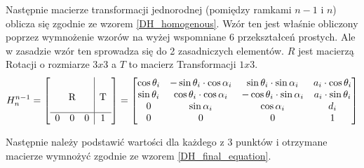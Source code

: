 Następnie macierze transformacji jednorodnej (pomiędzy ramkami $n-1$ i $n$) oblicza się zgodnie ze wzorem \ref{DH_homogenous}. Wzór ten jest właśnie obliczony poprzez wymnożenie wzorów na wyżej wspomniane 6 przekształceń prostych. Ale w zasadzie wzór ten sprowadza się do 2 zasadniczych elementów. $R$ jest macierzą Rotacji o rozmiarze $3x3$ a $T$ to macierz Transformacji $1x3$. \\

\begin{equation} \label{DH_homogenous}
H^{n-1}_n = 
\left[\begin{array}{ccc|c}
&&&\\
&&&\\
\multicolumn{3}{c|}{\smash{\raisebox{0.75\normalbaselineskip}{R}}} & \smash{\raisebox{0.75\normalbaselineskip}{T}}\\
\hline
0 & 0 & 0 & 1\\
\end{array}\right] = 
\left[\begin{matrix}
\cos{\theta_i} & -\sin{\theta_i} \cdot \cos{\alpha_i} & \sin{\theta_i} \cdot \sin{\alpha_i} & a_i \cdot \cos{\theta_i}\\
\sin{\theta_i} & \cos{\theta_i} \cdot \cos{\alpha_i} & -\cos{\theta_i} \cdot \sin{\alpha_i} & a_i \cdot \sin{\theta_i}\\
0 & \sin{\alpha_i} & \cos{\alpha_i} & d_i\\
0 & 0 & 0 & 1\\
\end{matrix}\right]
\end{equation}\cite{DH_matrix_AA_article}


Następnie należy podstawić wartości dla każdego z 3 punktów i otrzymane macierze wymnożyć zgodnie ze wzorem \ref{DH_final_equation}.

